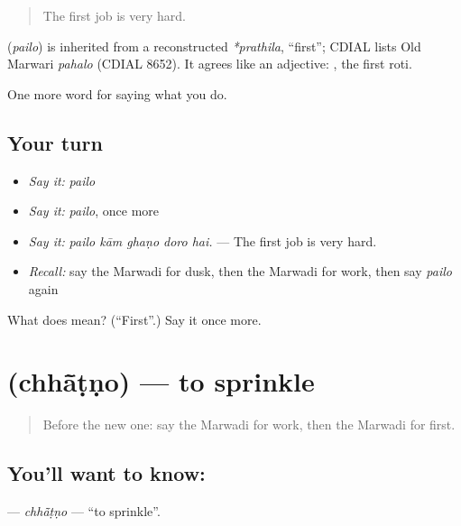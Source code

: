 \begin{quote}
The first job is very hard.
\end{quote}

\begin{cousinweb}
\textbf{} (\emph{pailo}) is inherited from a reconstructed \emph{*prathila}, \textquotedblleft{}first\textquotedblright{}; CDIAL lists Old Marwari \emph{pahalo} (CDIAL 8652). It agrees like an adjective: \textbf{ }, the first roti.
\end{cousinweb}

\begin{grammarlens}[title={What you've built}]
One more word for saying what you do.
\end{grammarlens}

\subsection*{Your turn}
\begin{itemize}
\raggedright
  \item \emph{Say it:} \emph{pailo}
  \item \emph{Say it:} \emph{pailo}, once more
  \item \emph{Say it:} \emph{pailo kām ghaṇo doro hai.} — The first job is very hard.
  \item \emph{Recall:} say the Marwadi for dusk, then the Marwadi for work, then say \emph{pailo} again
\end{itemize}

\begin{tcolorbox}[breakable,colback=teal!4,colframe=teal!35!black,title={Before you move on}]
What does  mean? (\textquotedblleft{}First\textquotedblright{}.) Say it once more.
\end{tcolorbox}
\section[\texorpdfstring{\mw{छांटणो} (chhā̃ṭṇo)}{छांटणो (chhā̃ṭṇo)}]{ (chhā̃ṭṇo) — to sprinkle}

\label{lesson:MW-C167-chhatno}



\begin{quote}
Before the new one: say the Marwadi for work, then the Marwadi for first.
\end{quote}

\subsection*{You'll want to know: }
\textbf{} — \emph{chhā̃ṭṇo} — \textquotedblleft{}to sprinkle\textquotedblright{}.

